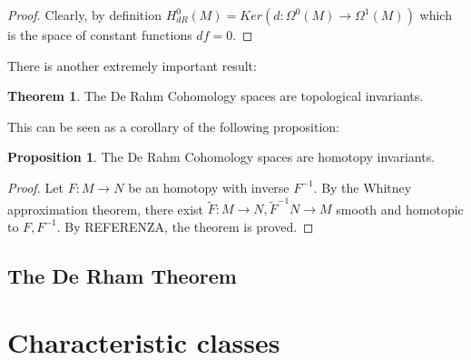 \documentclass[12pt,a4paper]{report}
\theoremstyle{definition}
\theoremstyle{Theorem}
\newtheorem{Theo}[Def]{Theorem}
\newtheorem{Prop}[Def]{Proposition}
\theoremstyle{definition}
\theoremstyle{definition}
\begin{document}
	\begin{proof}
		Clearly, by definition $H^0_{dR}(M)=Ker(d:\Omega^0(M)\rightarrow\Omega^1(M))$ which is the space of constant functions $df=0$.
	\end{proof}
	There is another extremely important result:
	\begin{Theo}
		The De Rahm Cohomology spaces are topological invariants.
	\end{Theo}
	This can be seen as a corollary of the following proposition:
	\begin{Prop}
		The De Rahm Cohomology spaces are homotopy invariants.
	\end{Prop}
	\begin{proof}
		Let $F:M\rightarrow N$ be an homotopy with inverse $F^{-1}$. By the Whitney approximation theorem, there exist $\tilde{F}:M\rightarrow N,\tilde{F}^{-1}N\rightarrow M$ smooth and homotopic to $F,F^{-1}$. By REFERENZA, the theorem is proved.
	\end{proof}
	\section{The De Rham Theorem}	
	\chapter{Characteristic classes}
\end{document}
